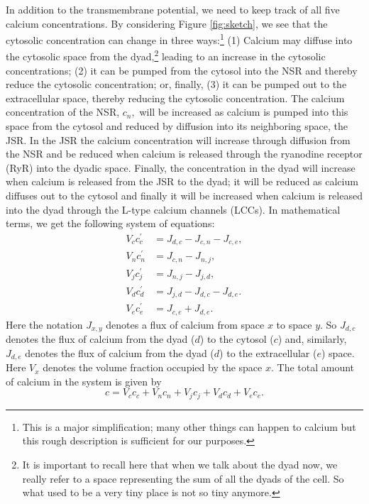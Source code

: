 \bigskip 
In addition to the transmembrane potential, we need to keep track of
all five calcium concentrations. 
By considering Figure \ref{fig:sketch}, we see that the cytosolic concentration can change in
three ways:\footnote{This is a major simplification; many other things can
happen to calcium but this rough description is sufficient for our purposes.
} (1) Calcium may diffuse into the cytosolic space from the
dyad,\footnote{It is important to recall here that when we talk about the dyad
now, we really refer to a space representing the sum of all the dyads of the
cell. So what used to be a very tiny place is not so tiny anymore.} leading to
an increase in the cytosolic concentrations; (2) it can be pumped from the cytosol into the
NSR and thereby reduce the cytosolic concentration; or, finally, (3) it can be
pumped out to the extracellular space, thereby reducing the cytosolic
concentration. The calcium concentration of the NSR, $c_{n},$ will be
increased as calcium is pumped into this space from the cytosol and reduced
by diffusion into its neighboring space, the JSR. In the JSR the calcium
concentration will increase through diffusion from the NSR and be reduced when
calcium is released through the ryanodine receptor (RyR) into the dyadic space. Finally, the
concentration in the dyad will increase when calcium is released from the JSR
to the dyad; it will be reduced as calcium diffuses out to the cytosol and
finally it will be increased when calcium is released into the dyad through
the L-type calcium channels (LCCs). In mathematical terms, we get the following system of
equations:%
\begin{align}
V_{c}c_{c}^{\prime}  & =J_{d,c}-J_{c,n}-J_{c,e},\label{c51}\\
V_{n}c_{n}^{\prime}  & =J_{c,n}-J_{n,j},\label{c52}\\
V_{j}c_{j}^{\prime}  & =J_{n,j}-J_{j,d},\label{c53}\\
V_{d}c_{d}^{\prime}  & =J_{j,d}-J_{d,c}-J_{d,e}.\label{c54} \\
V_{e}c_{e}^{\prime}  & =J_{c,e}+J_{d,e}.\label{c55}%
\end{align}
Here the notation $J_{x,y}$ denotes a flux of calcium from space $x$ to 
space $y.$ So $J_{d,c}$ denotes the flux of calcium from the dyad ($d$) to
the cytosol ($c$) and, similarly, $J_{d,e}$ denotes the flux of calcium from
the  dyad ($d$)  to the extracellular ($e$) space. Here $V_{x}$ denotes the
volume fraction occupied by the space $x.$  The total amount of calcium in the system is given by%
\begin{equation}
c=V_{c}c_{c}+V_{n}c_{n}+V_{j}c_{j}+V_{d}c_{d}+V_{e}c_{e}. \label{tot_ca}
\end{equation}


